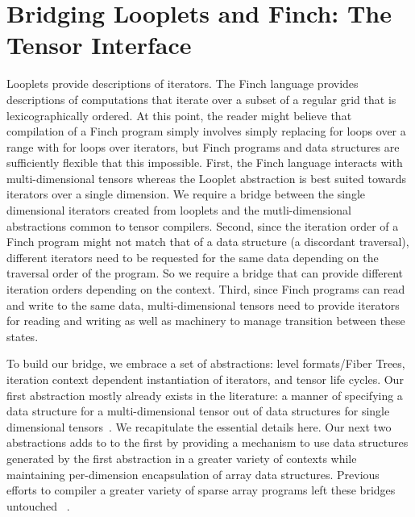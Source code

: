 \section{Bridging Looplets and Finch: The Tensor Interface}
Looplets provide descriptions of iterators. 
%
The Finch language provides descriptions of computations that iterate over a subset of a regular grid that is lexicographically ordered.
%
At this point, the reader might believe that compilation of a Finch program simply involves simply replacing for loops over a range with for loops over iterators, but Finch programs and data structures are sufficiently flexible that this impossible.
%
First, the Finch language interacts with multi-dimensional tensors whereas the Looplet abstraction is best suited towards iterators over a single dimension.
%
We require a bridge between the single dimensional iterators created from looplets and the mutli-dimensional abstractions common to tensor compilers.
%
Second, since the iteration order of a Finch program might not match that of a data structure (a discordant traversal), different iterators need to be requested for the same data depending on the traversal order of the program.
%
So we require a bridge that can provide different iteration orders depending on the context.
%
Third, since Finch programs can read and write to the same data, multi-dimensional tensors need to provide iterators for reading and writing as well as machinery to manage transition between these states.

To build our bridge, we embrace a set of abstractions: level formats/Fiber Trees, iteration context dependent instantiation of iterators, and tensor life cycles.
%
Our first abstraction mostly already exists in the literature: a manner of specifying a data structure for a multi-dimensional tensor out of data structures for single dimensional tensors~\cite{sze2017efficient,chou2022compilation, chou2018format, sparseTIR}. 
%
We recapitulate the essential details here.
%
Our next two abstractions adds to to the first by providing a mechanism to use data structures generated by the first abstraction in a greater variety of contexts while maintaining per-dimension encapsulation of array data structures.
%
Previous efforts to compiler a greater variety of sparse array programs left these bridges untouched ~\cite{henry_compilation_2021, won2023unified}.
%
%


